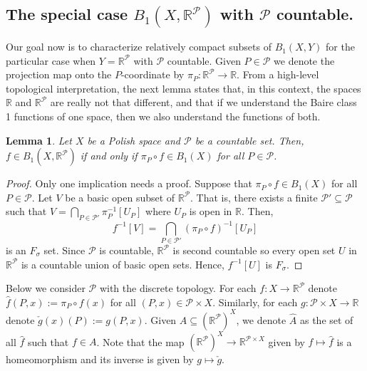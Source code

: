 \documentclass[psamsfonts]{amsart}
\newtheorem{lem}[thm]{Lemma}
\theoremstyle{definition}
\theoremstyle{remark}
\numberwithin{equation}{section}
\begin{document}
\subsection{The special case $B_1(X,\mathbb{R}^\mathcal{P})$   with $\mathcal{P}$ countable.}

Our goal now is to characterize relatively compact subsets of $B_1(X,Y)$ for the particular case when $Y=\mathbb{R}^\mathcal{P}$ with $\mathcal{P}$ countable.
Given $P\in\mathcal{P}$ we denote the projection map onto the $P$-coordinate by $\pi_P:\mathbb{R}^\mathcal{P}\rightarrow\mathbb{R}$.
From a high-level topological interpretation, the next lemma states that, in this context, the spaces $\mathbb{R}$ and $\mathbb{R}^\mathcal{P}$ are really not that different, and that if we understand the Baire class 1 functions of one space, then we also understand the functions of both.


\begin{lem}\label{baire 1 and projections}
    Let $X$ be a Polish space and $\mathcal{P}$ be a countable set.
Then, $f\in B_1(X,\mathbb{R}^\mathcal{P})$ if and only if $\pi_P\circ f\in B_1(X)$ for all $P\in\mathcal{P}$.
\end{lem}

\begin{proof}
    Only one implication needs a proof.
Suppose that $\pi_P\circ f\in B_1(X)$ for all $P\in\mathcal{P}$.
Let $V$ be a basic open subset of $\mathbb{R}^\mathcal{P}$.
That is, there exists a finite $\mathcal{P}'\subseteq\mathcal{P}$ such that $V=\bigcap_{P\in\mathcal{P}'}\pi_P^{-1}[U_P]$ where $U_P$ is open in $\mathbb{R}$.
Then, 
    $$f^{-1}[V]=\bigcap_{P\in\mathcal{P}'}(\pi_P\circ f)^{-1}[U_P]$$ is an $F_\sigma$ set.
Since $\mathcal{P}$ is countable, $\mathbb{R}^\mathcal{P}$ is second countable so every open set $U$ in $\mathbb{R}^\mathcal{P}$ is a countable union of basic open sets.
Hence, $f^{-1}[U]$ is $F_\sigma$.
\end{proof}




Below we consider $\mathcal{P}$ with the discrete topology.
For each $f:X\rightarrow\mathbb{R}^\mathcal{P}$ denote $\hat f(P,x):=\pi_P\circ f(x)$ for all $(P,x)\in\mathcal{P}\times X$.
Similarly, for each $g:\mathcal{P}\times X\rightarrow\mathbb{R}$ denote $\check g(x)(P):=g(P,x)$.
Given $A\subseteq (\mathbb{R}^\mathcal{P})^X$, we denote $\hat A$ as the set of all $\hat f$ such that $f\in A$.
Note that the map $\left(\mathbb{R}^\mathcal{P}\right)^X\to\mathbb{R}^{\mathcal{P}\times X}$ given by $f\mapsto\hat f$ is a homeomorphism and its inverse is given by $g\mapsto\check g$.
\end{document}

